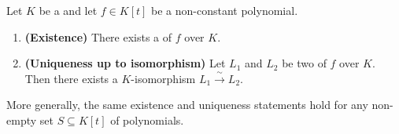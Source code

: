 \begin{theorem} \label{theorem:existence_and_uniqueness_of_splitting_fields}
Let $K$ be a  and let $f \in K[t]$ be a non-constant polynomial.

\begin{enumerate}
    \item \textbf{(Existence)} There exists a  of $f$ over $K$.
    \item \textbf{(Uniqueness up to isomorphism)} Let $L_1$ and $L_2$ be two  of $f$ over $K$. Then there exists a $K$-isomorphism $L_1 \xrightarrow{\,\sim\,} L_2$.
\end{enumerate}
More generally, the same existence and uniqueness statements hold for any non-empty set $S \subseteq K[t]$ of polynomials.
\end{theorem}
